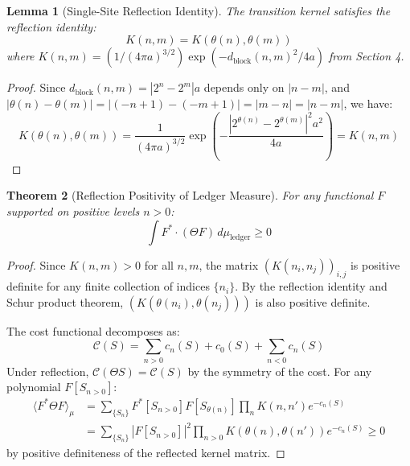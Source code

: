 \documentclass[11pt]{article}
\numberwithin{equation}{section}
\newtheorem{theorem}{Theorem}[section]
\newtheorem{lemma}[theorem]{Lemma}
\theoremstyle{definition}
\theoremstyle{remark}
\begin{document}
\begin{lemma}[Single-Site Reflection Identity]
The transition kernel satisfies the reflection identity:
\begin{equation}
K(n,m) = K(\theta(n), \theta(m))
\end{equation}
where $K(n,m) = (1/(4\pi a)^{3/2}) \exp(-d_{\text{block}}(n,m)^2/4a)$ from Section 4.
\end{lemma}

\begin{proof}
Since $d_{\text{block}}(n,m) = |2^n - 2^m|a$ depends only on $|n-m|$, and $|\theta(n) - \theta(m)| = |(-n+1) - (-m+1)| = |m-n| = |n-m|$, we have:
\begin{equation}
K(\theta(n), \theta(m)) = \frac{1}{(4\pi a)^{3/2}} \exp\left(-\frac{|2^{\theta(n)} - 2^{\theta(m)}|^2 a^2}{4a}\right) = K(n,m)
\end{equation}
\end{proof}

\begin{theorem}[Reflection Positivity of Ledger Measure]
For any functional $F$ supported on positive levels $n > 0$:
\begin{equation}
\int F^* \cdot (\Theta F) \, d\mu_{\text{ledger}} \geq 0
\end{equation}
\end{theorem}

\begin{proof}
Since $K(n,m) > 0$ for all $n,m$, the matrix $(K(n_i, n_j))_{i,j}$ is positive definite for any finite collection of indices $\{n_i\}$. By the reflection identity and Schur product theorem, $(K(\theta(n_i), \theta(n_j)))$ is also positive definite.

The cost functional decomposes as:
\begin{equation}
\mathcal{C}(S) = \sum_{n > 0} c_n(S) + c_0(S) + \sum_{n < 0} c_n(S)
\end{equation}
Under reflection, $\mathcal{C}(\Theta S) = \mathcal{C}(S)$ by the symmetry of the cost. For any polynomial $F[S_{n>0}]$:
\begin{align}
\langle F^* \Theta F \rangle_{\mu} &= \sum_{\{S_n\}} F^*[S_{n>0}] F[S_{\theta(n)}] \prod_n K(n,n') e^{-c_n(S)} \\
&= \sum_{\{S_n\}} |F[S_{n>0}]|^2 \prod_{n>0} K(\theta(n), \theta(n')) e^{-c_n(S)} \geq 0
\end{align}
by positive definiteness of the reflected kernel matrix.
\end{proof}
\end{document}
